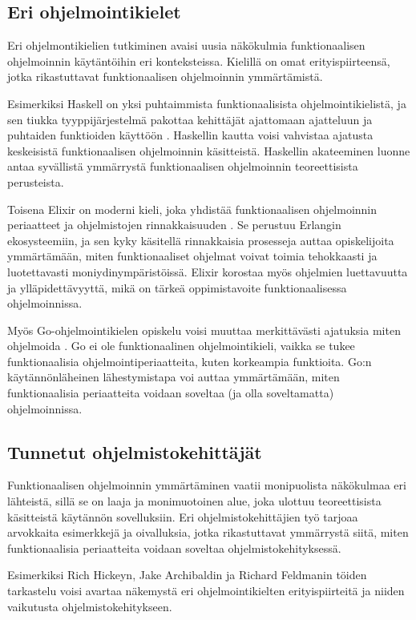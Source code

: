 \subsection{Eri ohjelmointikielet}

Eri ohjelmontikielien tutkiminen avaisi uusia näkökulmia funktionaalisen ohjelmoinnin käytäntöihin eri konteksteissa. Kielillä on omat erityispiirteensä, jotka rikastuttavat funktionaalisen ohjelmoinnin ymmärtämistä.

Esimerkiksi Haskell on yksi puhtaimmista funktionaalisista ohjelmointikielistä, ja sen tiukka tyyppijärjestelmä pakottaa kehittäjät ajattomaan ajatteluun ja puhtaiden funktioiden käyttöön \cite{haskellallmonad,haskellcomposition,haskellmonadlaws}. Haskellin kautta voisi vahvistaa ajatusta keskeisistä funktionaalisen ohjelmoinnin käsitteistä. Haskellin akateeminen luonne antaa syvällistä ymmärrystä funktionaalisen ohjelmoinnin teoreettisista perusteista.

Toisena Elixir on moderni kieli, joka yhdistää funktionaalisen ohjelmoinnin periaatteet ja ohjelmistojen rinnakkaisuuden \cite{elixir}. Se perustuu Erlangin ekosysteemiin, ja sen kyky käsitellä rinnakkaisia prosesseja auttaa opiskelijoita ymmärtämään, miten funktionaaliset ohjelmat voivat toimia tehokkaasti ja luotettavasti moniydinympäristöissä. Elixir korostaa myös ohjelmien luettavuutta ja ylläpidettävyyttä, mikä on tärkeä oppimistavoite funktionaalisessa ohjelmoinnissa.

Myös Go-ohjelmointikielen opiskelu voisi muuttaa merkittävästi ajatuksia miten ohjelmoida \cite{golang}. Go ei ole funktionaalinen ohjelmointikieli, vaikka se tukee funktionaalisia ohjelmointiperiaatteita, kuten korkeampia funktioita. Go:n käytännönläheinen lähestymistapa voi auttaa ymmärtämään, miten funktionaalisia periaatteita voidaan soveltaa (ja olla soveltamatta) ohjelmoinnissa.
\subsection{Tunnetut ohjelmistokehittäjät}

Funktionaalisen ohjelmoinnin ymmärtäminen vaatii monipuolista näkökulmaa eri lähteistä, sillä se on laaja ja monimuotoinen alue, joka ulottuu teoreettisista käsitteistä käytännön sovelluksiin. Eri ohjelmistokehittäjien työ tarjoaa arvokkaita esimerkkejä ja oivalluksia, jotka rikastuttavat ymmärrystä siitä, miten funktionaalisia periaatteita voidaan soveltaa ohjelmistokehityksessä.

Esimerkiksi Rich Hickeyn, Jake Archibaldin ja Richard Feldmanin töiden tarkastelu voisi avartaa näkemystä eri ohjelmointikielten erityispiirteitä ja niiden vaikutusta ohjelmistokehitykseen.

